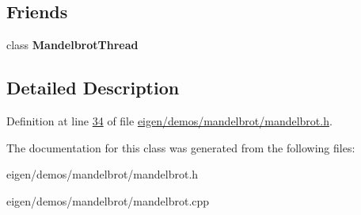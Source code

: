 \subsection*{Friends}
\begin{DoxyCompactItemize}
\item 
\mbox{\label{class_mandelbrot_widget_aa991c17fdb88b066b8d171989914a0a8}} 
class {\bfseries Mandelbrot\+Thread}
\end{DoxyCompactItemize}


\subsection{Detailed Description}


Definition at line \hyperlink{eigen_2demos_2mandelbrot_2mandelbrot_8h_source_l00034}{34} of file \hyperlink{eigen_2demos_2mandelbrot_2mandelbrot_8h_source}{eigen/demos/mandelbrot/mandelbrot.\+h}.



The documentation for this class was generated from the following files\+:\begin{DoxyCompactItemize}
\item 
eigen/demos/mandelbrot/mandelbrot.\+h\item 
eigen/demos/mandelbrot/mandelbrot.\+cpp\end{DoxyCompactItemize}

